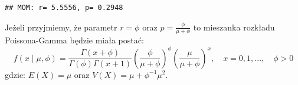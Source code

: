 \documentclass[polish,]{book}
\newenvironment{Shaded}{\begin{snugshade}}{\end{snugshade}}
\newcommand{\BuiltInTok}[1]{#1}
\newcommand{\DecValTok}[1]{\textcolor[rgb]{0.00,0.00,0.81}{#1}}
\newcommand{\FloatTok}[1]{\textcolor[rgb]{0.00,0.00,0.81}{#1}}
\newcommand{\ImportTok}[1]{#1}
\newcommand{\NormalTok}[1]{#1}
\newcommand{\OperatorTok}[1]{\textcolor[rgb]{0.81,0.36,0.00}{\textbf{#1}}}
\newcommand{\SpecialCharTok}[1]{\textcolor[rgb]{0.00,0.00,0.00}{#1}}
\newcommand{\StringTok}[1]{\textcolor[rgb]{0.31,0.60,0.02}{#1}}
\begin{document}
\begin{Shaded}
\end{Shaded}

\begin{verbatim}
## MOM: r= 5.5556, p= 0.2948
\end{verbatim}

Jeżeli przyjmiemy, że parametr \(r=\phi\) oraz \(p=\frac{\phi}{\mu+\phi}\) to mieszanka rozkładu Poissona-Gamma będzie miała postać:
\begin{equation}
f(x\;|\;\mu,\phi)
=\frac{\Gamma(x+\phi)}{\Gamma(\phi)\Gamma(x+1)}\left(\frac{\phi}{\mu+\phi}\right)^{\phi}\left(\frac{\mu}{\mu+\phi}\right)^{x},\quad x=0,1,...,\quad \phi>0
\label{eq:ub03}
\end{equation}
gdzie: \(E(X)=\mu\) oraz \(V(X)=\mu+\phi^{-1}\mu^2\).
\end{document}

